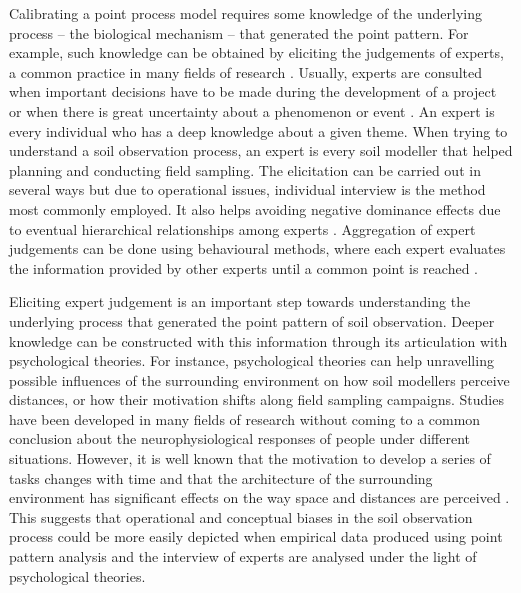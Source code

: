 Calibrating a point process model requires some knowledge of the underlying process -- the biological 
mechanism -- that generated the point pattern. For example, such knowledge can be obtained by eliciting the 
judgements of experts, a common practice in many fields of research \cite{OHaganEtAl2006}. Usually, experts 
are consulted when important decisions have to be made during the development of a project or when there is 
great uncertainty about a phenomenon or event \cite{MeyerEtAl2001}. An expert is every 
individual who has a deep knowledge about a given theme. When trying to understand a soil observation process,
an expert is every soil modeller that helped planning and conducting field sampling. The elicitation can be 
carried out in several ways \cite{Cooke1991, MeyerEtAl2001, OHaganEtAl2006} but due to operational issues, 
individual interview is the method most commonly employed. It also helps avoiding negative dominance effects 
due to eventual hierarchical relationships among experts \cite{Cooke1991}. Aggregation of expert judgements 
can 
be done using behavioural methods, where each expert evaluates the information provided by other experts until 
a common point is reached \cite{OrsiEtAl2011}.

Eliciting expert judgement is an important step towards understanding the underlying process that generated 
the point pattern of soil observation. Deeper knowledge can be constructed with this information 
through its articulation with psychological theories. For instance, psychological theories can help unravelling
 possible influences of the surrounding environment on how soil modellers perceive distances, or how 
their motivation shifts along field sampling campaigns. Studies have been developed in many fields of 
research \cite{Hull1932, BonnesEtAl2002, StampsEtAl2004, BonezziEtAl2011, Toure-TilleryEtAl2011a} without 
coming to a common conclusion about the neurophysiological responses of people under different situations. 
However, it is well known that the motivation to develop a series of tasks changes with time 
\cite{BonezziEtAl2011, Toure-TilleryEtAl2011a} and that the architecture of the surrounding environment has 
significant effects on the way space and distances are perceived \cite{Coeterier1994, EpsteinEtAl1998}. This 
suggests that operational and conceptual biases in the soil observation process could be more easily depicted 
when empirical data produced using point pattern analysis and the interview of experts are analysed under the 
light of psychological theories.

